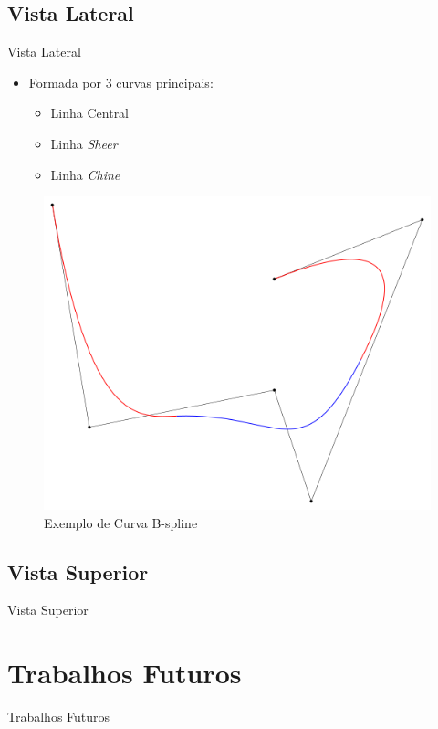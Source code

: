 \documentclass{beamer}
\begin{document}
\subsection{Vista Lateral}
\begin{frame}{Vista Lateral}
\begin{itemize}
	\item Formada por 3 curvas principais:
		\begin{itemize}
			\item Linha Central
			\item Linha \textit{Sheer}
			\item Linha \textit{Chine}
		\end{itemize}
	
\end{itemize}
\begin{figure}[h]
	\centering
	\includegraphics[scale=0.2]{bspline}
	\caption{Exemplo de Curva B-spline}
	\label{fig:central}
\end{figure}

\end{frame}
\subsection{Vista Superior}
\begin{frame}{Vista Superior}
\end{frame}

\section{Trabalhos Futuros}
\begin{frame}
\tableofcontents[ 
    currentsubsection, 
    hideothersubsections, 
    sectionstyle=show/shaded
    ] 
\end{frame}
\begin{frame}{Trabalhos Futuros}

\end{frame}
\end{document}
